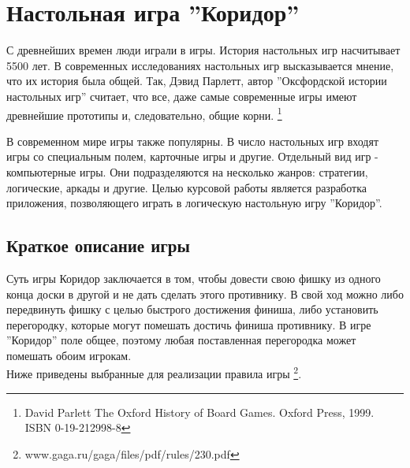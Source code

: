 \documentclass[a4paper]{article}
\begin{document}
\vfill %
\tableofcontents
\newpage

\section{Настольная игра ''Коридор''}
С древнейших времен люди играли в игры. История настольных игр насчитывает 5500 лет. В современных исследованиях настольных игр высказывается мнение, что их история была общей. Так, Дэвид Парлетт, автор ''Оксфордской истории настольных игр'' считает, что все, даже самые современные игры имеют древнейшие прототипы и, следовательно, общие корни. \footnote{David Parlett The Oxford History of Board Games. Oxford Press, 1999. \\ ISBN 0-19-212998-8}

В современном мире игры также популярны. В число настольных игр входят игры со специальным полем, карточные игры и другие. Отдельный вид игр - компьютерные игры. Они подразделяются на несколько жанров: стратегии, логические, аркады и другие. Целью курсовой работы является разработка приложения, позволяющего играть в логическую настольную игру ''Коридор''. 



\subsection{Краткое описание игры}
Суть игры Коридор заключается в том, чтобы довести свою фишку из одного конца доски в другой и не дать сделать этого противнику. В свой ход можно либо передвинуть фишку с целью быстрого достижения финиша, либо установить перегородку, которые могут помешать достичь финиша противнику. В игре ''Коридор'' поле общее, поэтому любая поставленная перегородка может помешать обоим игрокам. \\

Ниже приведены выбранные для реализации правила игры \footnote{www.gaga.ru/gaga/files/pdf/rules/230.pdf}.
\end{document}
